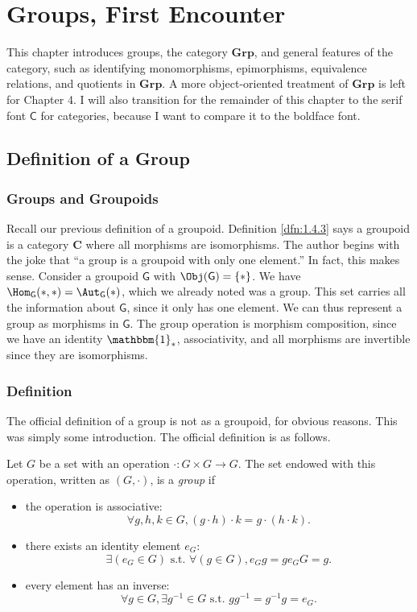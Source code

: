 \chapter{Groups, First Encounter}
This chapter introduces groups, the category $\mathbf{Grp}$, and general features of the category, such as identifying monomorphisms, epimorphisms, equivalence relations, and quotients in $\mathbf{Grp}$. A more object-oriented treatment of $\mathbf{Grp}$ is left for Chapter 4. I will also transition for the remainder of this chapter to the serif font $\mathsf{C}$ for categories, because I want to compare it to the boldface font.

\section{Definition of a Group}
\subsection{Groups and Groupoids}
Recall our previous definition of a groupoid. Definition \ref{dfn:1.4.3} says a groupoid is a category $\mathbf{C}$ where all morphisms are isomorphisms. The author begins with the joke that ``a group is a groupoid with only one element.'' In fact, this makes sense. Consider a groupoid $\mathsf{G}$ with $\Obj( \mathsf{G} )=\left\{ * \right\}  $. We have $\Hom_{\mathsf{G}}(* , *) =\Aut_{\mathsf{G}}( * ) $, which we already noted was a group. This set carries all the information about $\mathsf{G}$, since it only has one element. We can thus represent a group as morphisms in $\mathsf{G}$. The group operation is morphism composition, since we have an identity $\mathbbm{1}_{*} $, associativity, and all morphisms are invertible since they are isomorphisms.

\subsection{Definition}
The official definition of a group is not as a groupoid, for obvious reasons. This was simply some introduction. The official definition is as follows.
\begin{definition}[Group]\label{dfn:2.1.1}
	Let $G$ be a set with an operation $\cdot : G\times G \to G$. The set endowed with this operation, written as $(G,\cdot )$, is a \emph{group} if
	\begin{itemize}
		\item the operation is associative:
			\[
				\forall g,h,k\in G,(g\cdot h)\cdot k=g\cdot (h\cdot k)
			.\]
		\item there exists an identity element $e_G$:
			\[
				\exists (e_G\in G)\text{ s.t. }\forall (g\in G),e_Gg=ge_GG=g
			.\]
		\item every element has an inverse:
			\[
				\forall g\in G,\exists g^{-1}\in G\text{ s.t. }gg^{-1}=g^{-1}g=e_G
			.\]
	\end{itemize}
\end{definition}

